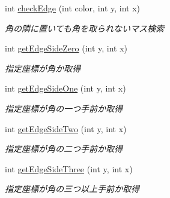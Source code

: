 \begin{DoxyCompactItemize}
int \hyperlink{classjp_1_1gr_1_1java__conf_1_1yuta__yoshinaga_1_1reversi_1_1model_1_1_reversi_a4874c6523adfdfd42dfbd625f5e3fe7a}{check\+Edge} (int color, int y, int x)
\begin{DoxyCompactList}\small\item\em 角の隣に置いても角を取られないマス検索 \end{DoxyCompactList}\item 
int \hyperlink{classjp_1_1gr_1_1java__conf_1_1yuta__yoshinaga_1_1reversi_1_1model_1_1_reversi_a3989b051544745724fc372d4a6b8a7f7}{get\+Edge\+Side\+Zero} (int y, int x)
\begin{DoxyCompactList}\small\item\em 指定座標が角か取得 \end{DoxyCompactList}\item 
int \hyperlink{classjp_1_1gr_1_1java__conf_1_1yuta__yoshinaga_1_1reversi_1_1model_1_1_reversi_aa3c701584a82e4656cb1c60123454953}{get\+Edge\+Side\+One} (int y, int x)
\begin{DoxyCompactList}\small\item\em 指定座標が角の一つ手前か取得 \end{DoxyCompactList}\item 
int \hyperlink{classjp_1_1gr_1_1java__conf_1_1yuta__yoshinaga_1_1reversi_1_1model_1_1_reversi_afc0b642f56e39a28ab5adc48c8fd2b98}{get\+Edge\+Side\+Two} (int y, int x)
\begin{DoxyCompactList}\small\item\em 指定座標が角の二つ手前か取得 \end{DoxyCompactList}\item 
int \hyperlink{classjp_1_1gr_1_1java__conf_1_1yuta__yoshinaga_1_1reversi_1_1model_1_1_reversi_a296b35d2241e6b3cff31bcb199c3d9aa}{get\+Edge\+Side\+Three} (int y, int x)
\begin{DoxyCompactList}\small\item\em 指定座標が角の三つ以上手前か取得 \end{DoxyCompactList}\end{DoxyCompactItemize}
